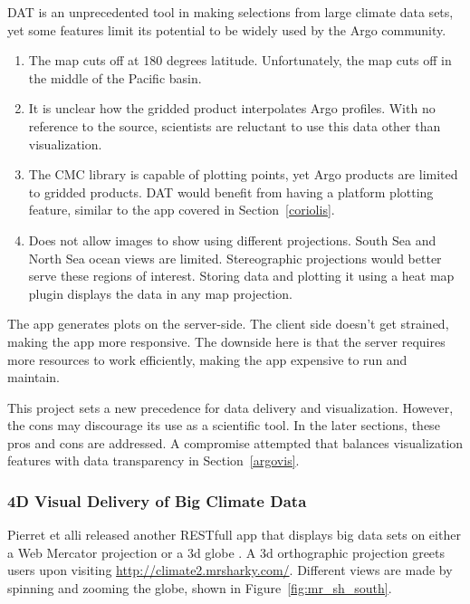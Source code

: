 DAT is an unprecedented tool in making selections from large climate data sets, yet some features limit its potential to be widely used by the Argo community.

\begin{enumerate}
\item The map cuts off at 180 degrees latitude. Unfortunately, the map cuts off in the middle of the Pacific basin. 
\item It is unclear how the gridded product interpolates Argo profiles. With no reference to the source, scientists are reluctant to use this data other than visualization.
\item The CMC library is capable of plotting points, yet Argo products are limited to gridded products. DAT would benefit from having a platform plotting feature, similar to the app covered in Section~\ref{coriolis}.
\item Does not allow images to show using different projections. South Sea and North Sea ocean views are limited. Stereographic projections would better serve these regions of interest. Storing data and plotting it using a heat map plugin displays the data in any map projection. 

\end{enumerate}

The app generates plots on the server-side. The client side doesn't get strained, making the app more responsive. The downside here is that the server requires more resources to work efficiently, making the app expensive to run and maintain.

This project sets a new precedence for data delivery and visualization. However, the cons may discourage its use as a scientific tool. In the later sections, these pros and cons are addressed. A compromise attempted that balances visualization features with data transparency in Section~\ref{argovis}.

\subsubsection{4D Visual Delivery of Big Climate Data}

Pierret et alli released another RESTfull app that displays big data sets on either a Web Mercator projection or a 3d globe \cite{pierret20174d}. A 3d orthographic projection greets users upon visiting \url{http://climate2.mrsharky.com/}. Different views are made by spinning and zooming the globe, shown in Figure~\ref{fig:mr_sh_south}.

